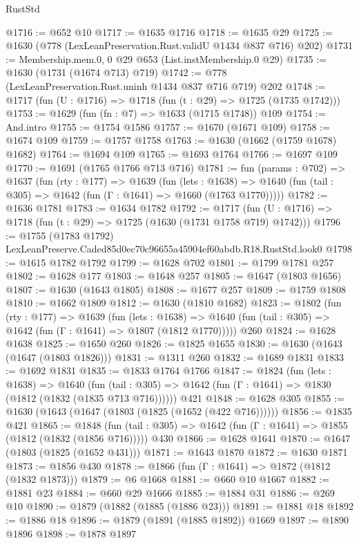 \begin{lexlean}{RustStd}
\begin{coremodule}
@1716 := @652 @10
@1717 := @1635 @1716
@1718 := @1635 @29
@1725 := @1630 (@778 (LexLeanPreservation.Rust.validU @1434 @837 @716) @202)
@1731 := Membership.mem.{0, 0} @29 @653 (List.instMembership.{0} @29)
@1735 := @1630 (@1731 (@1674 @713) @719)
@1742 := @778 (LexLeanPreservation.Rust.uninh @1434 @837 @716 @719) @202
@1748 := @1717 (fun (U : @1716) => @1718 (fun (t : @29) => @1725 (@1735 @1742)))
@1753 := @1629 (fun (fn : @7) => @1633 (@1715 @1748)) @109
@1754 := And.intro
@1755 := @1754 @1586
@1757 := @1670 (@1671 @109)
@1758 := @1674 @109
@1759 := @1757 @1758
@1763 := @1630 (@1662 (@1759 @1678) @1682)
@1764 := @1694 @109
@1765 := @1693 @1764
@1766 := @1697 @109
@1770 := @1691 (@1765 @1766 @713 @716)
@1781 := fun (params : @702) =>
  @1637
    (fun (rty : @177) =>
    @1639
      (fun (lets : @1638) =>
      @1640 (fun (tail : @305) => @1642 (fun (Γ : @1641) => @1660 (@1763 @1770)))))
@1782 := @1636 @1781
@1783 := @1634 @1782
@1792 := @1717 (fun (U : @1716) => @1718 (fun (t : @29) => @1725 (@1630 (@1731 @1758 @719) @1742)))
@1796 := @1755 (@1783 @1792) LexLeanPreserve.Caded85d0ec70c96655a45904ef60abdb.R18.RustStd.look0
@1798 := @1615 @1782 @1792
@1799 := @1628 @702
@1801 := @1799 @1781 @257
@1802 := @1628 @177
@1803 := @1648 @257
@1805 := @1647 (@1803 @1656)
@1807 := @1630 (@1643 @1805)
@1808 := @1677 @257
@1809 := @1759 @1808
@1810 := @1662 @1809
@1812 := @1630 (@1810 @1682)
@1823 := @1802
    (fun (rty : @177) =>
    @1639
      (fun (lets : @1638) =>
      @1640 (fun (tail : @305) => @1642 (fun (Γ : @1641) => @1807 (@1812 @1770)))))
    @260
@1824 := @1628 @1638
@1825 := @1650 @260
@1826 := @1825 @1655
@1830 := @1630 (@1643 (@1647 (@1803 @1826)))
@1831 := @1311 @260
@1832 := @1689 @1831
@1833 := @1692 @1831
@1835 := @1833 @1764 @1766
@1847 := @1824
    (fun (lets : @1638) =>
    @1640 (fun (tail : @305) => @1642 (fun (Γ : @1641) => @1830 (@1812 (@1832 (@1835 @713 @716))))))
    @421
@1848 := @1628 @305
@1855 := @1630 (@1643 (@1647 (@1803 (@1825 (@1652 (@422 @716))))))
@1856 := @1835 @421
@1865 := @1848
    (fun (tail : @305) => @1642 (fun (Γ : @1641) => @1855 (@1812 (@1832 (@1856 @716)))))
    @430
@1866 := @1628 @1641
@1870 := @1647 (@1803 (@1825 (@1652 @431)))
@1871 := @1643 @1870
@1872 := @1630 @1871
@1873 := @1856 @430
@1878 := @1866 (fun (Γ : @1641) => @1872 (@1812 (@1832 @1873)))
@1879 := @6 @1668
@1881 := @660 @10 @1667
@1882 := @1881 @23
@1884 := @660 @29 @1666
@1885 := @1884 @31
@1886 := @269 @10
@1890 := @1879 (@1882 (@1885 (@1886 @23)))
@1891 := @1881 @18
@1892 := @1886 @18
@1896 := @1879 (@1891 (@1885 @1892)) @1669
@1897 := @1890 @1896
@1898 := @1878 @1897

\end{coremodule}
\end{lexlean}
